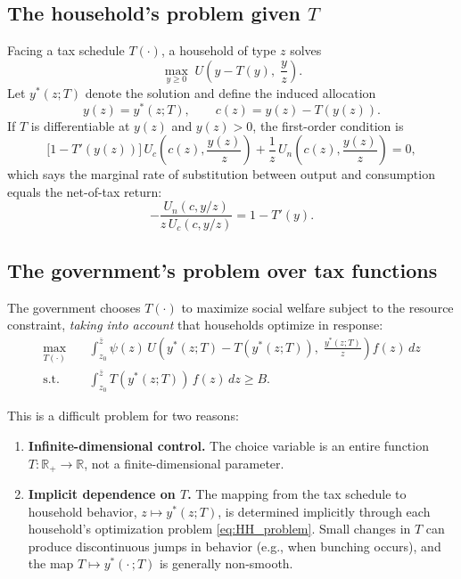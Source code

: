 \documentclass[12pt,a4paper]{article}
\theoremstyle{definition}
\theoremstyle{plain}
\theoremstyle{remark}
\newcommand{\R}{\mathbb{R}}
\newcommand{\zbar}{\bar{z}}
\newcommand{\zlow}{z_{\scriptscriptstyle 0}}
\begin{document}
\subsection{The household's problem given $T$}

Facing a tax schedule $T(\cdot)$, a household of type $z$ solves
\begin{equation}
\label{eq:HH_problem}
  \max_{y \geq 0} \; U\!\left( y - T(y), \; \frac{y}{z} \right).
\end{equation}
Let $y^*(z; T)$ denote the solution and define the induced allocation
\[
  y(z) = y^*(z; T), \qquad c(z) = y(z) - T(y(z)).
\]
If $T$ is differentiable at $y(z)$ and $y(z) > 0$, the first-order condition is
\begin{equation}
\label{eq:HH_foc_tax}
  \bigl[1 - T'(y(z))\bigr] \, U_c\!\left(c(z), \frac{y(z)}{z}\right) + \frac{1}{z} \, U_n\!\left(c(z), \frac{y(z)}{z}\right) = 0,
\end{equation}
which says the marginal rate of substitution between output and consumption equals the net-of-tax return:
\[
  -\frac{U_n(c, y/z)}{z \, U_c(c, y/z)} = 1 - T'(y).
\]

\subsection{The government's problem over tax functions}

The government chooses $T(\cdot)$ to maximize social welfare subject to the resource constraint, \emph{taking into account} that households optimize in response:
\begin{equation}
\label{eq:govt_tax}
\begin{split}
  \max_{T(\cdot)} \quad & \int_{\zlow}^{\zbar} \psi(z) \, U\!\left( y^*(z;T) - T(y^*(z;T)), \; \frac{y^*(z;T)}{z} \right) f(z) \, dz \\
  \text{s.t.} \quad & \int_{\zlow}^{\zbar} T(y^*(z;T)) \, f(z) \, dz \geq B.
\end{split}
\end{equation}

This is a difficult problem for two reasons:
\begin{enumerate}[label=(\roman*)]
  \item \textbf{Infinite-dimensional control.} The choice variable is an entire function $T: \R_+ \to \R$, not a finite-dimensional parameter.
  \item \textbf{Implicit dependence on $T$.} The mapping from the tax schedule to household behavior, $z \mapsto y^*(z; T)$, is determined implicitly through each household's optimization problem \eqref{eq:HH_problem}. Small changes in $T$ can produce discontinuous jumps in behavior (e.g., when bunching occurs), and the map $T \mapsto y^*(\cdot\,; T)$ is generally non-smooth.
\end{enumerate}
\end{document}
